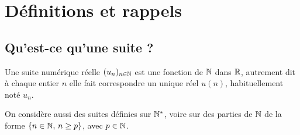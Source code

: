 \documentclass[a4paper,11pt,DIV20,BCOR0mm]{scrartcl}
\begin{document}
\section{Définitions et rappels}
\subsection{Qu'est-ce qu'une suite ?}
\begin{definition}
 Une suite numérique réelle $(u_n)_{n\in\mathbb{N}}$ est une fonction de $\mathbb{N}$ dans $\mathbb{R}$, autrement dit
à chaque entier $n$ elle fait correspondre un unique réel $u(n)$, habituellement noté $u_n$.
\end{definition}
On considère aussi des suites définies sur $\mathbb{N}^*$, voire sur des parties de $\mathbb{N}$ de
la forme $\{n\in\mathbb{N},\,n\geq p\}$, avec $p\in\mathbb{N}$.
\end{document}
